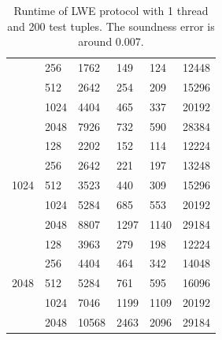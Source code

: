 \begin{table}[h!]
\begin{tabular}{|c|m{4em}|m{4em}|m{4em}|m{4em}|m{5em}|}
                                            & 256  & 1762 & 149                  & 124                    & 12448                                         \\ \cline{2-6} 
                                            & 512  & 2642 & 254                  & 209                    & 15296                                         \\ \cline{2-6} 
                                            & 1024 & 4404 & 465                  & 337                    & 20192                                         \\ \cline{2-6} 
                                            & 2048 & 7926 & 732                 & 590                   & 28384                                         \\ \hline
\multicolumn{1}{|l|}{\multirow{5}{*}{1024}} & 128  & 2202 & 152                  & 114                    & 12224                                         \\ \cline{2-6} 
\multicolumn{1}{|l|}{}                      & 256  & 2642 & 221                  & 197                    & 13248                                         \\ \cline{2-6} 
\multicolumn{1}{|l|}{}                      & 512  & 3523 & 440                  & 309                    & 15296                                         \\ \cline{2-6} 
\multicolumn{1}{|l|}{}                      & 1024 & 5284 & 685                 & 553                   & 20192                                         \\ \cline{2-6} 
\multicolumn{1}{|l|}{}                      & 2048 & 8807 & 1297                 & 1140                   & 29184                                         \\ \hline
\multicolumn{1}{|l|}{\multirow{5}{*}{2048}} & 128  & 3963 & 279                  & 198                    & 12224                                         \\ \cline{2-6} 
\multicolumn{1}{|l|}{}                      & 256  & 4404 & 464                  & 342                    & 14048                                         \\ \cline{2-6} 
\multicolumn{1}{|l|}{}                      & 512  & 5284 & 761                 & 595                    & 16096                                         \\ \cline{2-6} 
\multicolumn{1}{|l|}{}                      & 1024 & 7046 & 1199                 & 1109                   & 20192                                         \\ \cline{2-6} 
\multicolumn{1}{|l|}{}                      & 2048 & 10568 & 2463                 & 2096                   & 29184                                         \\ \hline
\end{tabular}
\caption{Runtime of LWE protocol with 1 thread and 200 test tuples. The soundness error is around 0.007.}
\label{table:benchmark-lwe}
\end{table}



